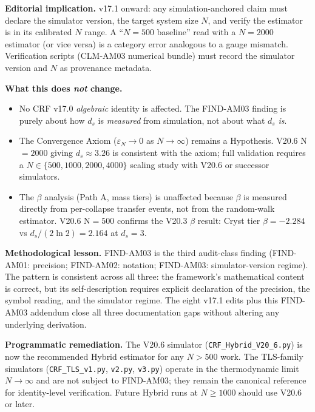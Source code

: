 \documentclass[12pt, a4paper]{article}
\begin{document}
\begin{formalbox}[title={FIND-AM03: Simulator Estimator Scaling Bias}]
\textbf{Editorial implication.} v17.1 onward: any
simulation-anchored claim must declare the simulator version, the
target system size $N$, and verify the estimator is in its
calibrated $N$ range. A ``$N=500$ baseline'' read with a $N=2000$
estimator (or vice versa) is a category error analogous to a gauge
mismatch. Verification scripts (CLM-AM03 numerical bundle) must
record the simulator version and $N$ as provenance metadata.

\textbf{What this does \emph{not} change.}
\begin{itemize}[leftmargin=*]
\item No CRF v17.0 \emph{algebraic} identity is affected. The
      FIND-AM03 finding is purely about how $d_s$ is \emph{measured}
      from simulation, not about what $d_s$ \emph{is}.
\item The Convergence Axiom ($\varepsilon_N \to 0$ as $N \to \infty$)
      remains a Hypothesis. V20.6 N$=2000$ giving $d_s \approx 3.26$
      is consistent with the axiom; full validation requires a
      $N \in \{500, 1000, 2000, 4000\}$ scaling study with V20.6 or
      successor simulators.
\item The $\beta$ analysis (Path A, mass tiers) is unaffected because
      $\beta$ is measured directly from per-collapse transfer events,
      not from the random-walk estimator. V20.6 N$=500$ confirms
      the V20.3 $\beta$ result: Cryst tier $\beta = -2.284$ vs
      $d_s/(2\ln 2) = 2.164$ at $d_s = 3$.
\end{itemize}
\end{formalbox}

\textbf{Methodological lesson.} FIND-AM03 is the third audit-class
finding (FIND-AM01: precision; FIND-AM02: notation; FIND-AM03:
simulator-version regime). The pattern is consistent across all
three: the framework's mathematical content is correct, but its
self-description requires explicit declaration of the precision,
the symbol reading, and the simulator regime. The eight v17.1 edits
plus this FIND-AM03 addendum close all three documentation gaps
without altering any underlying derivation.

\textbf{Programmatic remediation.} The V20.6 simulator
(\texttt{CRF\_Hybrid\_V20\_6.py}) is now the recommended Hybrid
estimator for any $N > 500$ work. The TLS-family simulators
(\texttt{CRF\_TLS\_v1.py}, \texttt{v2.py}, \texttt{v3.py}) operate
in the thermodynamic limit $N \to \infty$ and are not subject to
FIND-AM03; they remain the canonical reference for identity-level
verification. Future Hybrid runs at $N \geq 1000$ should use V20.6
or later.
\end{document}
